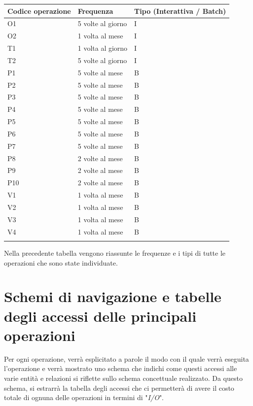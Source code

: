 \documentclass[a4paper, 12pt]{report}
\begin{document}
\begin{tabularx}{\linewidth}{X|X|X}
	\hline
	\textbf{Codice operazione} & \textbf{Frequenza} & \textbf{Tipo (Interattiva / Batch)}\\
	\hline
	\hline
	O1 & 5 volte al giorno & I\\
	\hline
	O2 & 1 volta al mese & I\\
	\hline
	T1 & 1 volta al giorno & I\\
	\hline
	T2 & 5 volte al giorno & I\\
	\hline
	P1 & 5 volte al mese & B\\
	\hline
	P2 & 5 volte al mese & B\\
	\hline
	P3 & 5 volte al mese & B\\
	\hline
	P4 & 5 volte al mese & B\\
	\hline
	P5 & 5 volte al mese & B\\
	\hline
	P6 & 5 volte al mese & B\\
	\hline
	P7 & 5 volte al mese & B\\
	\hline
	P8 & 2 volte al mese & B\\
	\hline
	P9 & 2 volte al mese & B\\
	\hline
	P10 & 2 volte al mese & B\\
	\hline
	V1 & 1 volta al mese & B\\
	\hline
	V2 & 1 volta al mese & B\\
	\hline
	V3 & 1 volta al mese & B\\
	\hline
	V4 & 1 volta al mese & B\\
	\hline
	\caption{Tabella della frequenza delle principali operazioni}
\end{tabularx}

Nella precedente tabella vengono riassunte le frequenze e i tipi di tutte le operazioni che sono state individuate.

\section{Schemi di navigazione e tabelle degli accessi delle principali operazioni}

Per ogni operazione, verrà esplicitato a parole il modo con il quale verrà eseguita l'operazione e verrà mostrato uno schema che indichi come questi
accessi alle varie entità e relazioni si riflette sullo schema concettuale realizzato. Da questo schema, si estrarrà la tabella degli accessi che ci
permetterà di avere il costo totale di ognuna delle operazioni in termini di "\textit{I/O}".
\end{document}
